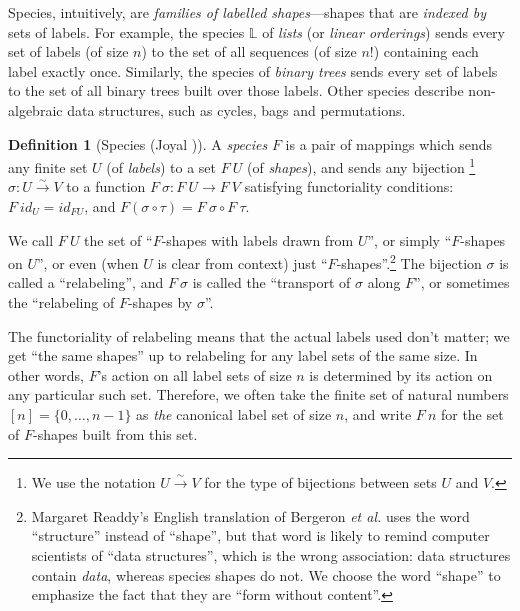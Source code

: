 \documentclass[preprint,authoryear]{sigplanconf}
\newcommand{\pref}[1]{\prettyref{#1}}
\newcommand{\etal}{\latin{et al.}\xspace}
\newcommand{\term}[1]{\emph{#1}}
\newcommand{\latin}[1]{\textit{#1}}
\newcommand{\bbb}[1]{\ensuremath{\mathbb{#1}}\xspace}
\newcommand{\bij}{\stackrel{\sim}{\longrightarrow}}
\theoremstyle{definition}
\newtheorem{defn}[thm]{Definition}
\theoremstyle{remark}
\providecommand{\L}{}
\renewcommand{\L}{\bbb{L}}     %
\begin{document}
Species, intuitively, are \emph{families of labelled shapes}---shapes
that are \emph{indexed by} sets of labels.  For example, the species
$\L$ of \emph{lists} (or \emph{linear orderings}) sends every set of
labels (of size $n$) to the set of all sequences (of size $n!$)
containing each label exactly once.  Similarly, the species of
\emph{binary trees} sends every set of labels to the set of all binary
trees built over those labels.  Other species describe non-algebraic
data structures, such as cycles, bags and permutations.

\begin{defn}[Species (Joyal \cite{joyal,bll})]
\label{defn:species-set}
A \term{species} $F$ is a pair of mappings which sends any finite set
$U$ (of \term{labels}) to a set $F\ U$ (of \term{shapes}), and sends
any bijection%
\footnote{We use the notation $U \bij V$ for the type of bijections
  between sets $U$ and $V$.} $\sigma : U \bij V$ to a function $F\
\sigma : F\ U \to F\ V$
satisfying functoriality conditions:
$F\ id_U = id_{F U}$, and
$F (\sigma \circ \tau) = F\ \sigma \circ F\ \tau$.
\end{defn}

We call $F\ U$ the set of ``\mbox{$F$-shapes} with labels drawn from $U$'',
or simply ``\mbox{$F$-shapes} on $U$'', or even (when $U$ is clear from
context) just ``\mbox{$F$-shapes}''.\footnote{Margaret Readdy's English translation
  of Bergeron \etal \cite{bll} uses the word ``structure'' instead of
  ``shape'', but that word is likely to remind computer scientists of
  ``data structures'', which is the wrong association: data structures
  contain \emph{data}, whereas species shapes do not.  We choose the
  word ``shape'' to emphasize the fact that they are ``form without
  content''.} The bijection $\sigma$ is called a ``relabeling'', and $F\ \sigma$ is called the ``transport of $\sigma$ along
$F$'', or sometimes the ``relabeling of \mbox{$F$-shapes} by $\sigma$''.

The functoriality of relabeling means that the actual labels used
don't matter; we get ``the same shapes'' up to relabeling for any
label sets of the same size.  In other words, $F$'s action on all
label sets of size $n$ is determined by its action on any particular
such set. Therefore, we often take the finite set of natural numbers $[n] = \{0,
\dots, n-1\}$ as \emph{the} canonical label set of size $n$, and write
$F\ n$ for the set of $F$-shapes built from this set.
\end{document}
